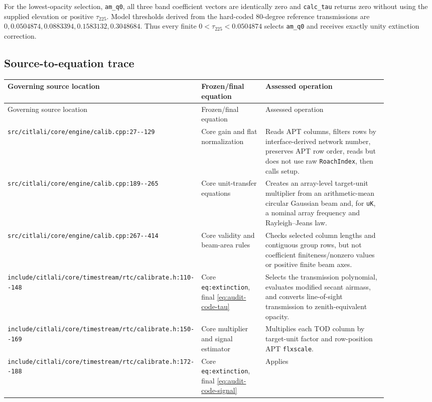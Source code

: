 \documentclass[11pt]{article}
\newcommand{\code}[1]{\nolinkurl{#1}}
\begin{document}
For the lowest-opacity selection, \code{am_q0}, all three band coefficient
vectors are identically zero and \code{calc_tau} returns zero without using
the supplied elevation or positive \(\tau_{225}\).  Model thresholds derived
from the hard-coded 80-degree reference transmissions are
\(0,0.0504874,0.0883394,0.1583132,0.3048684\).  Thus every finite
\(0<\tau_{225}<0.0504874\) selects \code{am_q0} and receives exactly unity
extinction correction.

\subsection{Source-to-equation trace}

\begin{longtable}{L{0.30\linewidth}L{0.18\linewidth}L{0.40\linewidth}}
\toprule
Governing source location & Frozen/final equation & Assessed operation\\
\midrule
\endfirsthead
\toprule
Governing source location & Frozen/final equation & Assessed operation\\
\midrule
\endhead
\code{src/citlali/core/engine/calib.cpp:27--129} &
Core gain and flat normalization & Reads APT
columns, filters rows by interface-derived network number, preserves APT row
order, reads but does not use raw \code{RoachIndex}, then calls setup.\\
\code{src/citlali/core/engine/calib.cpp:189--265} & Core unit-transfer
equations & Creates an array-level
target-unit multiplier from an arithmetic-mean circular Gaussian beam and,
for \code{uK}, a nominal array frequency and Rayleigh--Jeans law.\\
\code{src/citlali/core/engine/calib.cpp:267--414} & Core validity and beam-area
rules & Checks selected column lengths and contiguous
group rows, but not coefficient finiteness/nonzero values or positive finite
beam axes.\\
\code{include/citlali/core/timestream/rtc/calibrate.h:110--148} & Core
\code{eq:extinction}, final \eqref{eq:audit-code-tau} & Selects the
transmission polynomial, evaluates modified secant airmass, and converts
line-of-sight transmission to zenith-equivalent opacity.\\
\code{include/citlali/core/timestream/rtc/calibrate.h:150--169} & Core
multiplier and signal estimator & Multiplies each TOD
column by target-unit factor and row-position APT \code{flxscale}.\\
\code{include/citlali/core/timestream/rtc/calibrate.h:172--188} & Core
\code{eq:extinction}, final \eqref{eq:audit-code-signal} & Applies

\end{longtable}
\end{document}
